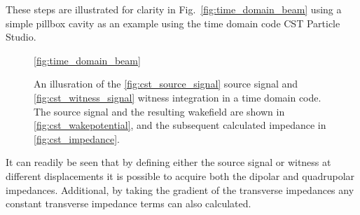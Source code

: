 These steps are illustrated for clarity in Fig.~\ref{fig:time_domain_beam} using a simple pillbox cavity as an example using the time domain code CST Particle Studio.

\begin{figure}
\subfigure[]{

\label{fig:cst_source_signal}
}
\subfigure[]{

\label{fig:cst_witness_signal}
}
\subfigure[]{

\label{fig:cst_wakepotential}
}
\subfigure[]{

\label{fig:cst_impedance}
}

\caption{An illusration of the \ref{fig:cst_source_signal} source signal and \ref{fig:cst_witness_signal} witness integration in a time domain code. The source signal and the resulting wakefield are shown in \ref{fig:cst_wakepotential}, and the subsequent calculated impedance in \ref{fig:cst_impedance}.}
\ref{fig:time_domain_beam}
\end{figure}

It can readily be seen that by defining either the source signal or witness at different displacements it is possible to acquire both the dipolar and quadrupolar impedances. Additional, by taking the gradient of the transverse impedances any constant transverse impedance terms can also calculated.
